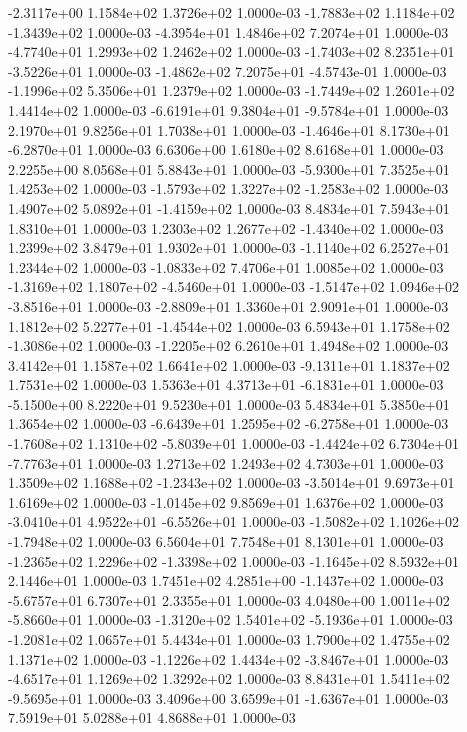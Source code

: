 -2.3117e+00  1.1584e+02  1.3726e+02  1.0000e-03
-1.7883e+02  1.1184e+02 -1.3439e+02  1.0000e-03
-4.3954e+01  1.4846e+02  7.2074e+01  1.0000e-03
-4.7740e+01  1.2993e+02  1.2462e+02  1.0000e-03
-1.7403e+02  8.2351e+01 -3.5226e+01  1.0000e-03
-1.4862e+02  7.2075e+01 -4.5743e-01  1.0000e-03
-1.1996e+02  5.3506e+01  1.2379e+02  1.0000e-03
-1.7449e+02  1.2601e+02  1.4414e+02  1.0000e-03
-6.6191e+01  9.3804e+01 -9.5784e+01  1.0000e-03
2.1970e+01 9.8256e+01 1.7038e+01  1.0000e-03
-1.4646e+01  8.1730e+01 -6.2870e+01  1.0000e-03
6.6306e+00 1.6180e+02 8.6168e+01  1.0000e-03
2.2255e+00 8.0568e+01 5.8843e+01  1.0000e-03
-5.9300e+01  7.3525e+01  1.4253e+02  1.0000e-03
-1.5793e+02  1.3227e+02 -1.2583e+02  1.0000e-03
 1.4907e+02  5.0892e+01 -1.4159e+02  1.0000e-03
8.4834e+01 7.5943e+01 1.8310e+01  1.0000e-03
 1.2303e+02  1.2677e+02 -1.4340e+02  1.0000e-03
1.2399e+02 3.8479e+01 1.9302e+01  1.0000e-03
-1.1140e+02  6.2527e+01  1.2344e+02  1.0000e-03
-1.0833e+02  7.4706e+01  1.0085e+02  1.0000e-03
-1.3169e+02  1.1807e+02 -4.5460e+01  1.0000e-03
-1.5147e+02  1.0946e+02 -3.8516e+01  1.0000e-03
-2.8809e+01  1.3360e+01  2.9091e+01  1.0000e-03
 1.1812e+02  5.2277e+01 -1.4544e+02  1.0000e-03
 6.5943e+01  1.1758e+02 -1.3086e+02  1.0000e-03
-1.2205e+02  6.2610e+01  1.4948e+02  1.0000e-03
3.4142e+01 1.1587e+02 1.6641e+02  1.0000e-03
-9.1311e+01  1.1837e+02  1.7531e+02  1.0000e-03
 1.5363e+01  4.3713e+01 -6.1831e+01  1.0000e-03
-5.1500e+00  8.2220e+01  9.5230e+01  1.0000e-03
5.4834e+01 5.3850e+01 1.3654e+02  1.0000e-03
-6.6439e+01  1.2595e+02 -6.2758e+01  1.0000e-03
-1.7608e+02  1.1310e+02 -5.8039e+01  1.0000e-03
-1.4424e+02  6.7304e+01 -7.7763e+01  1.0000e-03
1.2713e+02 1.2493e+02 4.7303e+01  1.0000e-03
 1.3509e+02  1.1688e+02 -1.2343e+02  1.0000e-03
-3.5014e+01  9.6973e+01  1.6169e+02  1.0000e-03
-1.0145e+02  9.8569e+01  1.6376e+02  1.0000e-03
-3.0410e+01  4.9522e+01 -6.5526e+01  1.0000e-03
-1.5082e+02  1.1026e+02 -1.7948e+02  1.0000e-03
6.5604e+01 7.7548e+01 8.1301e+01  1.0000e-03
-1.2365e+02  1.2296e+02 -1.3398e+02  1.0000e-03
-1.1645e+02  8.5932e+01  2.1446e+01  1.0000e-03
 1.7451e+02  4.2851e+00 -1.1437e+02  1.0000e-03
-5.6757e+01  6.7307e+01  2.3355e+01  1.0000e-03
 4.0480e+00  1.0011e+02 -5.8660e+01  1.0000e-03
-1.3120e+02  1.5401e+02 -5.1936e+01  1.0000e-03
-1.2081e+02  1.0657e+01  5.4434e+01  1.0000e-03
1.7900e+02 1.4755e+02 1.1371e+02  1.0000e-03
-1.1226e+02  1.4434e+02 -3.8467e+01  1.0000e-03
-4.6517e+01  1.1269e+02  1.3292e+02  1.0000e-03
 8.8431e+01  1.5411e+02 -9.5695e+01  1.0000e-03
 3.4096e+00  3.6599e+01 -1.6367e+01  1.0000e-03
7.5919e+01 5.0288e+01 4.8688e+01  1.0000e-03
